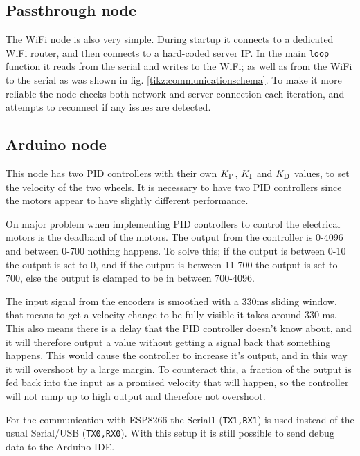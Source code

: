 \documentclass[11pt]{article}
\begin{document}
\subsection{Passthrough node}
\label{subsec:ptn}
The WiFi node is also very simple. During startup it connects to a dedicated WiFi router, and then connects to a hard-coded server IP. In the main \texttt{loop} function it reads from the serial and writes to the WiFi; as well as from the WiFi to the serial as was shown in fig. \vref{tikz:communicationschema}. To make it more reliable the node checks both network and server connection each iteration, and attempts to reconnect if any issues are detected. \par

\subsection{Arduino node}
\label{subsec:dd}
This node has two PID controllers with their own ${K_{\textup{P}}}$, ${K_{\textup{I}}}$ and ${K_{\textup{D}}}$  values, to set the velocity of the two wheels. It is necessary to have two PID controllers since the motors appear to have slightly different performance.\par

On major problem when implementing PID controllers to control the electrical motors is the deadband of the motors. The output from the controller is 0-4096 and between 0-700 nothing happens. To solve this; if the output is between 0-10 the output is set to 0, and if the output is between 11-700 the output is set to 700, else the output is clamped to be in between 700-4096.\par

The input signal from the encoders is smoothed with a 330ms sliding window, that means to get a velocity change to be fully visible it takes around 330 ms. This also means there is a delay that the PID controller doesn't know about, and it will therefore output a value without getting a signal back that something happens. This would cause the controller to increase it's output, and in this way it will overshoot by a large margin. To counteract this, a fraction of the output is fed back into the input as a promised velocity that will happen, so the controller will not ramp up to high output and therefore not overshoot.\par

For the communication with ESP8266 the Serial1 (\texttt{TX1,RX1}) is used instead of the usual Serial/USB (\texttt{TX0,RX0}). With this setup it is still possible to send debug data to the Arduino IDE.\par
\end{document}
